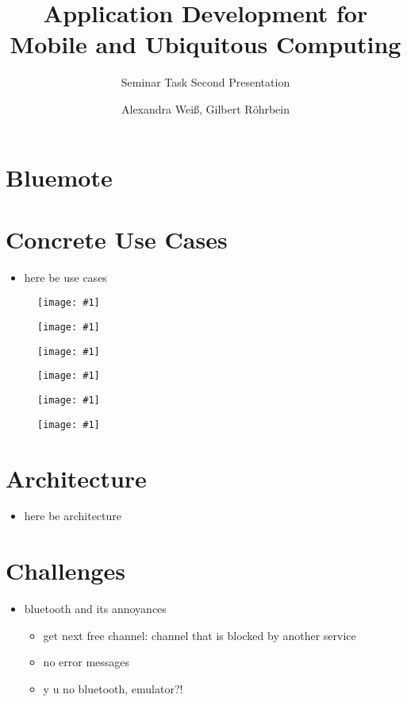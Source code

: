 \documentclass[ddc nogerman]{tudbeamer}
\newcommand{\imageframe}[1]{
    \begin{frame}
        \begin{figure}
            \centering
            \texttt{[image: \#1]}
        \end{figure}
    \end{frame}
}
\begin{document}

\title{Application Development for Mobile and Ubiquitous Computing}
\subtitle{Seminar Task Second Presentation}
\author{Alexandra Weiß, Gilbert Röhrbein}

\maketitle

\section{Bluemote}
\begin{frame}
\end{frame}

\section{Concrete Use Cases}
\begin{frame}
    \begin{itemize}
        \item here be use cases

    \end{itemize}
\end{frame}

\imageframe{img/btactivate.png}
\imageframe{img/btauth.png}
\imageframe{img/choosedevice.png}
\imageframe{img/choosefunction.png}
\imageframe{img/presentation.png}
\imageframe{img/vlc.png}

\section{Architecture}
\begin{frame}
    \begin{itemize}
        \item here be architecture
    \end{itemize}
\end{frame}

\section{Challenges}
\begin{frame}
    \begin{itemize}
        \item bluetooth and its annoyances
        \begin{itemize}
        	\item get next free channel: channel that is blocked by another service
        	\item no error messages
            \item y u no bluetooth, emulator?!
        \end{itemize}
    \end{itemize}
\end{frame}
\end{document}
